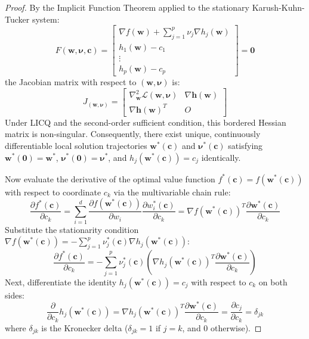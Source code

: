 \begin{proof}
By the Implicit Function Theorem applied to the stationary Karush-Kuhn-Tucker system:
\begin{equation}
F(\mathbf{w}, \boldsymbol{\nu}, \mathbf{c}) = \begin{bmatrix} \nabla f(\mathbf{w}) + \sum_{j=1}^p \nu_j \nabla h_j(\mathbf{w}) \\ h_1(\mathbf{w}) - c_1 \\ \vdots \\ h_p(\mathbf{w}) - c_p \end{bmatrix} = \mathbf{0}
\end{equation}
the Jacobian matrix with respect to $(\mathbf{w}, \boldsymbol{\nu})$ is:
\begin{equation}
J_{(\mathbf{w}, \boldsymbol{\nu})} = \begin{bmatrix} \nabla_{\mathbf{w}}^2 \mathcal{L}(\mathbf{w}, \boldsymbol{\nu}) & \nabla \mathbf{h}(\mathbf{w}) \\ \nabla \mathbf{h}(\mathbf{w})^T & O \end{bmatrix}
\end{equation}
Under LICQ and the second-order sufficient condition, this bordered Hessian matrix is non-singular. Consequently, there exist unique, continuously differentiable local solution trajectories $\mathbf{w}^*(\mathbf{c})$ and $\boldsymbol{\nu}^*(\mathbf{c})$ satisfying $\mathbf{w}^*(\mathbf{0}) = \mathbf{w}^*$, $\boldsymbol{\nu}^*(\mathbf{0}) = \boldsymbol{\nu}^*$, and $h_j(\mathbf{w}^*(\mathbf{c})) = c_j$ identically.

Now evaluate the derivative of the optimal value function $f^*(\mathbf{c}) = f(\mathbf{w}^*(\mathbf{c}))$ with respect to coordinate $c_k$ via the multivariable chain rule:
\begin{equation}
\frac{\partial f^*(\mathbf{c})}{\partial c_k} = \sum_{i=1}^d \frac{\partial f(\mathbf{w}^*(\mathbf{c}))}{\partial w_i} \frac{\partial w_i^*(\mathbf{c})}{\partial c_k} = \nabla f(\mathbf{w}^*(\mathbf{c}))^T \frac{\partial \mathbf{w}^*(\mathbf{c})}{\partial c_k}
\end{equation}
Substitute the stationarity condition $\nabla f(\mathbf{w}^*(\mathbf{c})) = -\sum_{j=1}^p \nu_j^*(\mathbf{c}) \nabla h_j(\mathbf{w}^*(\mathbf{c}))$:
\begin{equation}
\frac{\partial f^*(\mathbf{c})}{\partial c_k} = -\sum_{j=1}^p \nu_j^*(\mathbf{c}) \left( \nabla h_j(\mathbf{w}^*(\mathbf{c}))^T \frac{\partial \mathbf{w}^*(\mathbf{c})}{\partial c_k} \right)
\label{eq:chain_rule_sub}
\end{equation}
Next, differentiate the identity $h_j(\mathbf{w}^*(\mathbf{c})) = c_j$ with respect to $c_k$ on both sides:
\begin{equation}
\frac{\partial}{\partial c_k} h_j(\mathbf{w}^*(\mathbf{c})) = \nabla h_j(\mathbf{w}^*(\mathbf{c}))^T \frac{\partial \mathbf{w}^*(\mathbf{c})}{\partial c_k} = \frac{\partial c_j}{\partial c_k} = \delta_{jk}
\end{equation}
where $\delta_{jk}$ is the Kronecker delta ($\delta_{jk} = 1$ if $j = k$, and $0$ otherwise).


\end{proof}
